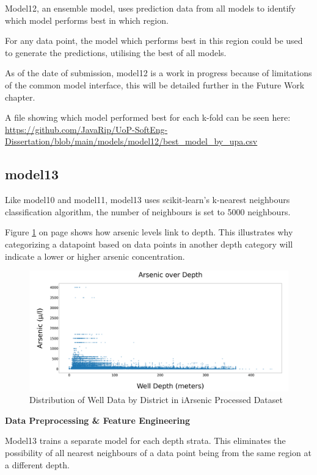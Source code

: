 Model12, an ensemble model, uses prediction data from all models to identify which model performs best in which region.

For any data point, the model which performs best in this region could be used to generate the predictions, utilising the best of all models.

As of the date of submission, model12 is a work in progress because of limitations of the common model interface, this will be detailed further in the Future Work chapter.

A file showing which model performed best for each k-fold can be seen here: \url{https://github.com/JavaRip/UoP-SoftEng-Dissertation/blob/main/models/model12/best_model_by_upa.csv}

\subsection{model13}

Like model10 and model11, model13 uses scikit-learn's k-nearest neighbours classification algorithm, the number of neighbours is set to 5000 neighbours.

Figure \ref{fig:x aod} on page \pageref{fig:x aod} shows how arsenic levels link to depth. This illustrates why categorizing a datapoint based on data points in another depth category will indicate a lower or higher arsenic concentration.

\begin{figure}[!htb]
    \centering
    \includegraphics[scale=0.43]{figures/arsenic_over_depth.png} 
    \caption{Distribution of Well Data by District in iArsenic Processed Dataset}
    \label{fig:x aod}
\end{figure}

\textbf{Data Preprocessing \& Feature Engineering}

Model13 trains a separate model for each depth strata. This eliminates the possibility of all nearest neighbours of a data point being from the same region at a different depth. 

